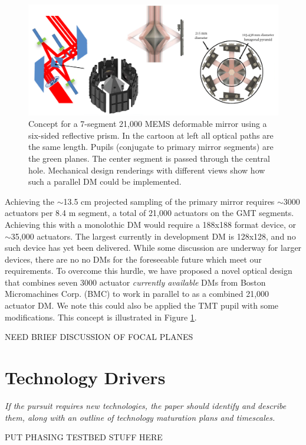 \documentclass[12pt,preprint]{aastex}
\begin{document}
\begin{figure} [h!]
\centering
\includegraphics[width=6in]{figures/pardm.png}
\caption{ Concept for a 7-segment 21,000 MEMS deformable mirror using a six-sided reflective prism.  In the cartoon at left all optical paths are the same length.  Pupils (conjugate to primary mirror segments) are the green planes. The center segment is passed through the central hole. Mechanical design renderings with different views show how such a parallel DM could be implemented.  \label{fig:pardm}}
\end{figure}

Achieving the $\sim$13.5 cm projected sampling of the primary mirror requires $\sim$3000 actuators per 8.4 m segment, a total of 21,000 actuators on the GMT segments.   Achieving this with a monolothic DM would require a 188x188 format device, or $\sim$35,000 actuators. The largest currently in development DM is 128x128, and no such device has yet been delivered.  While some discussion are underway for larger devices, there are no no DMs for the foreseeable future which meet our requirements. To overcome this hurdle, we have proposed a novel optical design that combines seven 3000 actuator \textit{currently available} DMs from Boston Micromachines Corp. (BMC) to work in parallel to as a combined 21,000 actuator DM. We note this could also be applied the TMT pupil with some modifications.  This concept is illustrated in Figure \ref{fig:pardm}.


NEED BRIEF DISCUSSION OF FOCAL PLANES

\section{Technology Drivers} 
\textit{If the pursuit requires new technologies, the paper should identify and
describe them, along with an outline of technology maturation plans and timescales.}

PUT PHASING TESTBED STUFF HERE
\end{document}
